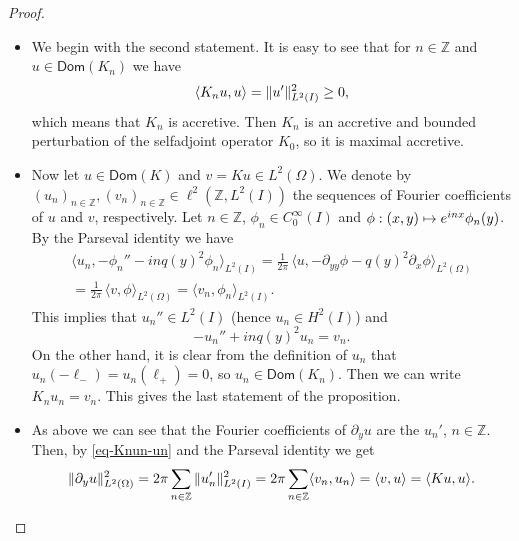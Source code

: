 \documentclass[11pt]{article}
\newcommand{\skpt}{\smallskip}
\numberwithin{equation}{section}
\def\mto{\mathchoice{\longmapsto}{\mapsto}{\mapsto}{\mapsto}}
\theoremstyle{plain}
\theoremstyle{definition}
\newcommand{\nr}[1]{\Vert #1\Vert}
\newcommand{\binnp}[2]{\bigl\langle #1 , #2 \bigr\rangle}
\newcommand{\innps}[2]{\langle #1 , #2 \rangle}\let\innp\innps
\newcommand{\1}{\mathds 1}
\let\Re\relax
\DeclareMathOperator{\Re}{\mathsf{Re}\mkern2mu}
\newcommand{\Dom}{\mathsf{Dom}}
\newcommand{\Z}{\mathbb{Z}}
\let\vf\phi
\let\O\Omega
\begin{document}
\skpt
\begin{proof}
\begin{itemize}
\item
We begin with the second statement. It is easy to see that for $n \in \Z$ and $u \in \Dom(K_n)$ we have
\begin{equation} \label{eq-Knun-un}
\Re \innp{K_n u}{u} = \nr{u'}_{L^2(I)}^2 \geq 0,
\end{equation}
which means that $K_n$ is accretive. Then $K_n$ is an accretive and bounded perturbation of the selfadjoint operator $K_0$, so it is maximal accretive.

\item
Now let $u \in \Dom(K)$ and $v = Ku \in L^2(\O)$. We denote by $(u_n)_{n \in \Z}, (v_n)_{n \in \Z} \in \ell^2(\Z,L^2(I))$ the sequences of Fourier coefficients of $u$ and $v$, respectively. Let $n \in \Z$, $\vf_n \in C_0^\infty(I)$ and $\vf : (x,y) \mto e^{inx} \vf_n(y)$. By the Parseval identity we have
\begin{multline*}
\innp{u_n}{-\vf_n'' - in q(y)^2 \vf_n}_{L^2(I)}
= \frac 1 {2\pi}\, \binnp{u}{-\partial_{yy} \vf - q(y)^2 \partial_x \vf}_{L^2(\O)}\\
= \frac 1 {2\pi}\, \innp{v}{\vf}_{L^2(\O)} = \innp{v_n}{\vf_n}_{L^2(I)}.
\end{multline*}
This implies that $u_n'' \in L^2(I)$ (hence $u_n \in H^2(I)$) and
\[
-u_n'' + in q(y)^2 u_n = v_n.
\]
On the other hand, it is clear from the definition of $u_n$ that $u_n(-\ell_-) = u_n(\ell_+) = 0$, so $u_n \in \Dom(K_n)$. Then we can write $K_n u_n = v_n$. This gives the last statement of the proposition.

\item
As above we can see that the Fourier coefficients of $\partial_y u$ are the $u_n'$, $n \in \Z$. Then, by \eqref{eq-Knun-un} and the Parseval identity we get
\begin{equation} \label{eq-K-accretive}
\nr{\partial_y u }_{L^2(\O)}^2 = 2\pi \sum_{n \in \Z} \nr{u_n'}_{L^2(I)}^2 = 2\pi \Re \sum_{n \in \Z} \innp{v_n}{u_n} = \Re \innp{v}{u} = \Re \innps{Ku}{u}.
\end{equation}


\end{itemize}
\end{proof}
\end{document}
